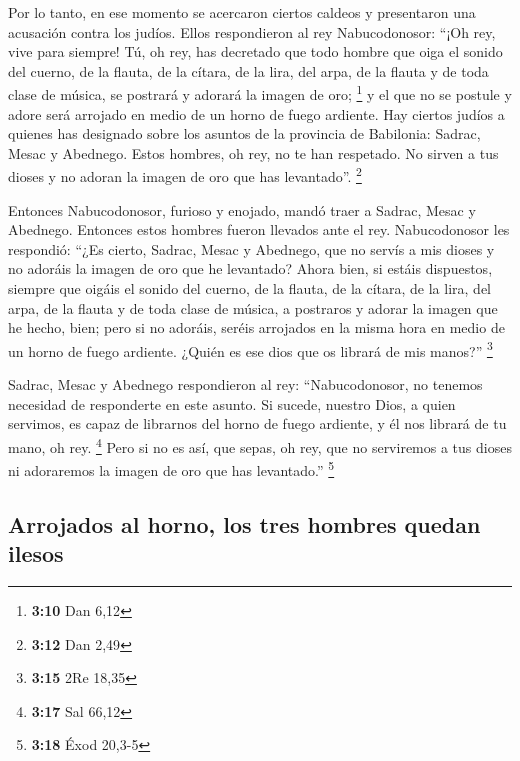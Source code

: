 \begin{paracol}{2}
 Por lo tanto, en ese momento se acercaron ciertos caldeos
y presentaron una acusación contra los judíos.  Ellos
respondieron al rey Nabucodonosor: ``¡Oh rey, vive para siempre!
 Tú, oh rey, has decretado que todo hombre que oiga el
sonido del cuerno, de la flauta, de la cítara, de la lira, del arpa, de
la flauta y de toda clase de música, se postrará y adorará la imagen de
oro; \footnote{\textbf{3:10} Dan 6,12}  y el que no se
postule y adore será arrojado en medio de un horno de fuego ardiente.
 Hay ciertos judíos a quienes has designado sobre los
asuntos de la provincia de Babilonia: Sadrac, Mesac y Abednego. Estos
hombres, oh rey, no te han respetado. No sirven a tus dioses y no adoran
la imagen de oro que has levantado''. \footnote{\textbf{3:12} Dan 2,49}

 Entonces Nabucodonosor, furioso y enojado, mandó traer a
Sadrac, Mesac y Abednego. Entonces estos hombres fueron llevados ante el
rey.  Nabucodonosor les respondió: ``¿Es cierto, Sadrac,
Mesac y Abednego, que no servís a mis dioses y no adoráis la imagen de
oro que he levantado?  Ahora bien, si estáis dispuestos,
siempre que oigáis el sonido del cuerno, de la flauta, de la cítara, de
la lira, del arpa, de la flauta y de toda clase de música, a postraros y
adorar la imagen que he hecho, bien; pero si no adoráis, seréis
arrojados en la misma hora en medio de un horno de fuego ardiente.
¿Quién es ese dios que os librará de mis manos?'' \footnote{\textbf{3:15}
  2Re 18,35}

 Sadrac, Mesac y Abednego respondieron al rey:
``Nabucodonosor, no tenemos necesidad de responderte en este asunto.
 Si sucede, nuestro Dios, a quien servimos, es capaz de
librarnos del horno de fuego ardiente, y él nos librará de tu mano, oh
rey. \footnote{\textbf{3:17} Sal 66,12}  Pero si no es
así, que sepas, oh rey, que no serviremos a tus dioses ni adoraremos la
imagen de oro que has levantado.'' \footnote{\textbf{3:18} Éxod 20,3-5}

\hypertarget{arrojados-al-horno-los-tres-hombres-quedan-ilesos}{%
\subsection{Arrojados al horno, los tres hombres quedan
ilesos}\label{arrojados-al-horno-los-tres-hombres-quedan-ilesos}}


\end{paracol}
